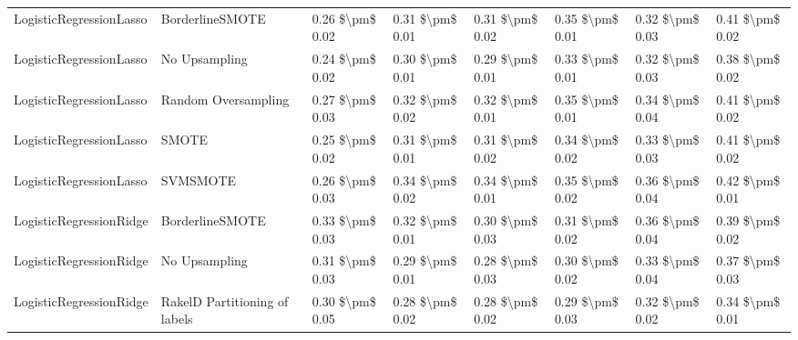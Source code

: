 \begin{tabular}{llllllll}
        LogisticRegressionLasso &               BorderlineSMOTE & 0.26 \$\textbackslash pm\$ 0.02 &           0.31 \$\textbackslash pm\$ 0.01 &       0.31 \$\textbackslash pm\$ 0.02 &        0.35 \$\textbackslash pm\$ 0.01 &                         0.32 \$\textbackslash pm\$ 0.03 & 0.41 \$\textbackslash pm\$ 0.02 \\
        LogisticRegressionLasso &                 No Upsampling & 0.24 \$\textbackslash pm\$ 0.02 &           0.30 \$\textbackslash pm\$ 0.01 &       0.29 \$\textbackslash pm\$ 0.01 &        0.33 \$\textbackslash pm\$ 0.01 &                         0.32 \$\textbackslash pm\$ 0.03 & 0.38 \$\textbackslash pm\$ 0.02 \\
        LogisticRegressionLasso &           Random Oversampling & 0.27 \$\textbackslash pm\$ 0.03 &           0.32 \$\textbackslash pm\$ 0.02 &       0.32 \$\textbackslash pm\$ 0.01 &        0.35 \$\textbackslash pm\$ 0.01 &                         0.34 \$\textbackslash pm\$ 0.04 & 0.41 \$\textbackslash pm\$ 0.02 \\
        LogisticRegressionLasso &                         SMOTE & 0.25 \$\textbackslash pm\$ 0.02 &           0.31 \$\textbackslash pm\$ 0.01 &       0.31 \$\textbackslash pm\$ 0.02 &        0.34 \$\textbackslash pm\$ 0.02 &                         0.33 \$\textbackslash pm\$ 0.03 & 0.41 \$\textbackslash pm\$ 0.02 \\
        LogisticRegressionLasso &                      SVMSMOTE & 0.26 \$\textbackslash pm\$ 0.03 &           0.34 \$\textbackslash pm\$ 0.02 &       0.34 \$\textbackslash pm\$ 0.01 &        0.35 \$\textbackslash pm\$ 0.02 &                         0.36 \$\textbackslash pm\$ 0.04 & 0.42 \$\textbackslash pm\$ 0.01 \\
        LogisticRegressionRidge &               BorderlineSMOTE & 0.33 \$\textbackslash pm\$ 0.03 &           0.32 \$\textbackslash pm\$ 0.01 &       0.30 \$\textbackslash pm\$ 0.03 &        0.31 \$\textbackslash pm\$ 0.02 &                         0.36 \$\textbackslash pm\$ 0.04 & 0.39 \$\textbackslash pm\$ 0.02 \\
        LogisticRegressionRidge &                 No Upsampling & 0.31 \$\textbackslash pm\$ 0.03 &           0.29 \$\textbackslash pm\$ 0.01 &       0.28 \$\textbackslash pm\$ 0.03 &        0.30 \$\textbackslash pm\$ 0.02 &                         0.33 \$\textbackslash pm\$ 0.04 & 0.37 \$\textbackslash pm\$ 0.03 \\
        LogisticRegressionRidge & RakelD Partitioning of labels & 0.30 \$\textbackslash pm\$ 0.05 &           0.28 \$\textbackslash pm\$ 0.02 &       0.28 \$\textbackslash pm\$ 0.02 &        0.29 \$\textbackslash pm\$ 0.03 &                         0.32 \$\textbackslash pm\$ 0.02 & 0.34 \$\textbackslash pm\$ 0.01 \\

\end{tabular}
